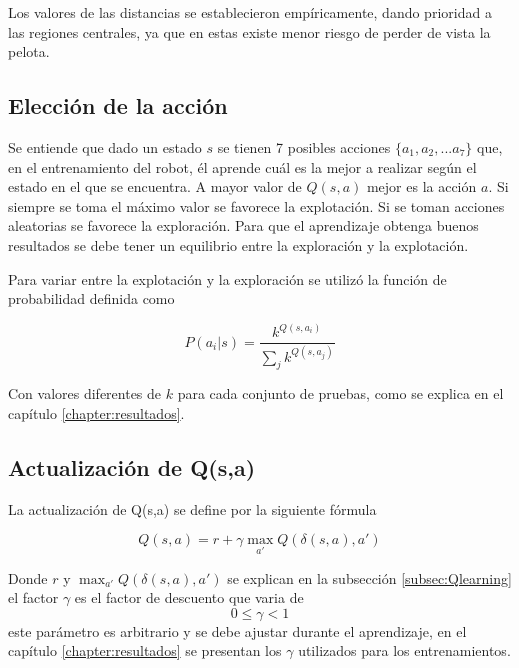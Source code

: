 Los valores de las distancias se establecieron empíricamente, dando prioridad a las regiones centrales, ya que en estas existe menor riesgo de perder de vista la pelota.  

\subsection{Elecci\'on de la acci\'on}\label{subsec:eleccionAccion}

Se entiende que dado un estado $s$ se tienen 7 posibles acciones $\{a_1, a_2, ... a_7\}$ que, en el entrenamiento del robot, él aprende cuál es la mejor a realizar según el estado en el que se encuentra. A mayor valor de $Q(s,a)$ mejor es la acción $a$. Si siempre se toma el máximo valor se favorece la explotación. Si se toman acciones aleatorias se favorece la exploración. Para que el aprendizaje obtenga buenos resultados se debe tener un equilibrio entre la exploración y la explotación. 

Para variar entre la explotación y la exploración se utiliz\'o la función de probabilidad definida como  %


\begin{equation}
 P(a_{i} | s) = \dfrac{k^{Q(s,a_{i})}}{\sum_{j}k^{Q(s,a_{j})}}
\end{equation}

Con valores diferentes de $k$ para cada conjunto de pruebas, como se explica en el capítulo \ref{chapter:resultados}.  
 
 
\subsection{Actualizaci\'on de Q(s,a)}

La actualizaci\'on de Q(s,a) se define por la siguiente fórmula 
 
\begin{equation}
Q (s,a) = r + {\gamma\max_{a'}} Q(\delta(s ,a ) , a') 
\end{equation} 



Donde $r$ y $\max_{a'} Q(\delta(s,a),a')$ se explican en la subsecci\'on \ref{subsec:Qlearning} el factor $\gamma$ es el factor de descuento que varia de \[   0 \leq  \gamma < 1 \] este par\'ametro es arbitrario y se debe ajustar durante el aprendizaje, en el cap\'itulo \ref{chapter:resultados}  se presentan los $\gamma$ utilizados para los entrenamientos.
